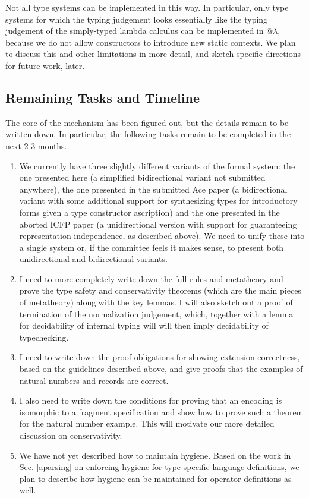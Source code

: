 Not all type systems can be implemented in this way. In particular, only type systems for which the typing judgement looks essentially like the typing judgement of the simply-typed lambda calculus can be implemented in @$\lambda$, because we do not allow constructors to introduce new static contexts. We plan to discuss this and other limitations in more detail, and sketch specific directions for future work, later.

\subsection{Remaining Tasks and Timeline}
The core of the mechanism has been figured out, but the details remain to be written down. In particular, the following tasks remain to be completed in the next 2-3 months.
\begin{enumerate}
\item We currently have three slightly different variants of the formal system: the one presented here (a simplified bidirectional variant not submitted anywhere), the one presented in the submitted Ace paper (a bidirectional variant with some additional support for synthesizing types for introductory forms given a type constructor ascription) and the one presented in the aborted ICFP paper (a unidirectional version with support for guaranteeing representation independence, as described above). We need to unify these into a single system or, if the committee feels it makes sense, to present both unidirectional and bidirectional variants.
\item I need to more completely write down the full rules and metatheory and prove the type safety and conservativity theorems (which are the main pieces of metatheory) along with the key lemmas. I will also sketch out a proof of termination of the normalization judgement, which, together with a lemma for decidability of internal typing will will then imply decidability of typechecking.
\item I need to write down the proof obligations for showing extension correctness, based on the guidelines described above, and give proofs that the examples of natural numbers and records are correct. 
\item I also need to write down the conditions for proving that an encoding is isomorphic to a fragment specification and show how to prove such a theorem for the natural number example. This will motivate our more detailed discussion on conservativity.
\item We have not yet described how to maintain hygiene. Based on the work in Sec. \ref{aparsing} on enforcing hygiene for type-specific language definitions, we plan to describe how hygiene can be maintained for operator definitions as well.
\end{enumerate}
\newpage

